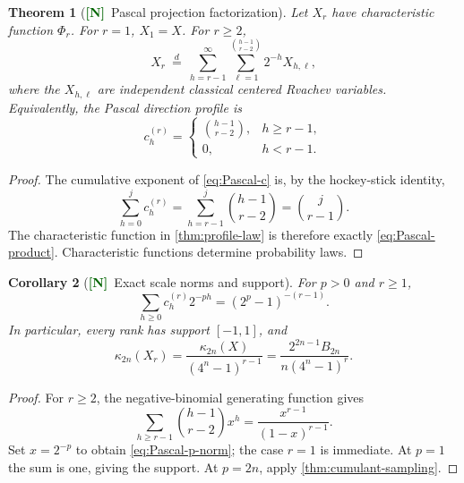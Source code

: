 \documentclass[11pt]{article}
\numberwithin{equation}{section}
\newtheorem{theorem}{Theorem}[section]
\newtheorem{corollary}[theorem]{Corollary}
\theoremstyle{definition}
\theoremstyle{remark}
\newcommand{\New}{\textcolor{darkgreen}{\textsf{\textbf{[N]}}}}
\begin{document}
\begin{theorem}[\New\ Pascal projection factorization]
\label{thm:Pascal-factorization}
Let $X_r$ have characteristic function $\Phi_r$.  For $r=1$, $X_1=X$.  For
$r\ge2$,
\begin{equation}
 \boxed{
 X_r\ \stackrel d=\
 \sum_{h=r-1}^{\infty}
 \sum_{\ell=1}^{\binom{h-1}{r-2}}2^{-h}X_{h,\ell},}
 \label{eq:Pascal-Radon-factorization}
\end{equation}
where the $X_{h,\ell}$ are independent classical centered Rvachev variables.
Equivalently, the Pascal direction profile is
\begin{equation}
 c_h^{(r)}=
 \begin{cases}
  \binom{h-1}{r-2},&h\ge r-1,\\
  0,&h<r-1.
 \end{cases}
 \label{eq:Pascal-c}
\end{equation}
\end{theorem}

\begin{proof}
The cumulative exponent of \eqref{eq:Pascal-c} is, by the hockey-stick
identity,
\[
 \sum_{h=0}^{j}c_h^{(r)}
 =\sum_{h=r-1}^{j}\binom{h-1}{r-2}
 =\binom{j}{r-1}.
\]
The characteristic function in \cref{thm:profile-law} is therefore exactly
\eqref{eq:Pascal-product}.  Characteristic functions determine probability
laws.
\end{proof}

\begin{corollary}[\New\ Exact scale norms and support]
\label{cor:Pascal-norms}
For $p>0$ and $r\ge1$,
\begin{equation}
 \sum_{h\ge0}c_h^{(r)}2^{-ph}
 =(2^p-1)^{-(r-1)}.
 \label{eq:Pascal-p-norm}
\end{equation}
In particular, every rank has support $[-1,1]$, and
\begin{equation}
 \kappa_{2n}(X_r)
 =\frac{\kappa_{2n}(X)}{(4^n-1)^{r-1}}
 =\frac{2^{2n-1}B_{2n}}{n(4^n-1)^r}.
 \label{eq:Pascal-cumulants}
\end{equation}
\end{corollary}

\begin{proof}
For $r\ge2$, the negative-binomial generating function gives
\[
 \sum_{h\ge r-1}\binom{h-1}{r-2}x^h
 =\frac{x^{r-1}}{(1-x)^{r-1}}.
\]
Set $x=2^{-p}$ to obtain \eqref{eq:Pascal-p-norm}; the case $r=1$ is
immediate.  At $p=1$ the sum is one, giving the support.  At $p=2n$, apply
\cref{thm:cumulant-sampling}.
\end{proof}
\end{document}

